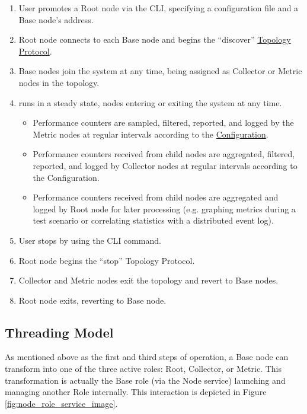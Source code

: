\begin{enumerate}

\item User promotes a Root node via the \dcamp CLI, specifying a configuration file and a Base node's address.
\item Root node connects to each Base node and begins the ``discover'' \hyperref[proto_topo]{Topology Protocol}.
\item Base nodes join the \dcamp system at any time, being assigned as Collector or Metric nodes in the topology.

\item \dcamp runs in a steady state, nodes entering or exiting the system at any time.

      \begin{itemize}
      \item Performance counters are sampled, filtered, reported, and logged by the Metric nodes at regular intervals
            according to the \hyperref[imp_configuration]{\dcamp Configuration}.
      \item Performance counters received from child nodes are aggregated, filtered, reported, and logged by Collector
            nodes at regular intervals according to the \dcamp Configuration.
      \item Performance counters received from child nodes are aggregated and logged by Root node for later processing
            (e.g. graphing metrics during a test scenario or correlating statistics with a distributed event log).
      \end{itemize}

\item User stops \dcamp by using the \dcamp CLI command.
\item Root node begins the ``stop'' Topology Protocol.
\item Collector and Metric nodes exit the topology and revert to Base nodes.
\item Root node exits, reverting to Base node.

\end{enumerate}

\subsection{Threading Model}

As mentioned above as the first and third steps of \dcamp operation, a Base node can transform into one of the three
active \dcamp roles: Root, Collector, or Metric. This transformation is actually the Base role (via the Node service)
launching and managing another Role internally. This interaction is depicted in Figure
\ref{fig:node_role_service_image}.

